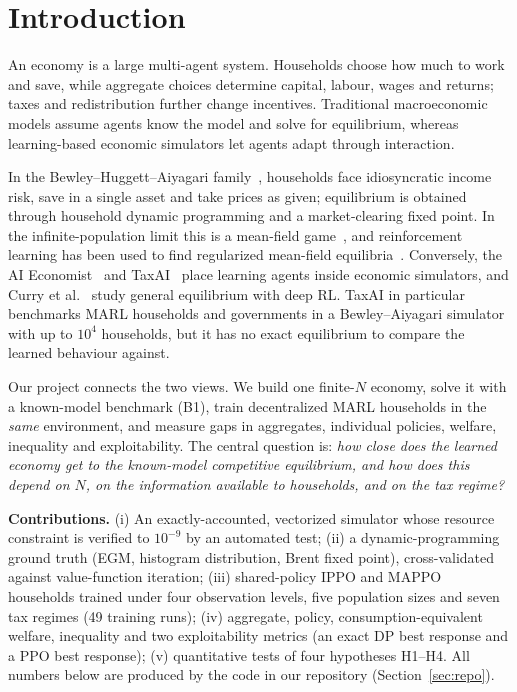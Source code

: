 \section{Introduction}
An economy is a large multi-agent system. Households choose how much to work and save, while aggregate choices
determine capital, labour, wages and returns; taxes and redistribution further change incentives. Traditional
macroeconomic models assume agents know the model and solve for equilibrium, whereas learning-based economic
simulators let agents adapt through interaction.

In the Bewley--Huggett--Aiyagari family~\cite{aiyagari,huggett}, households face idiosyncratic income risk, save in a
single asset and take prices as given; equilibrium is obtained through household dynamic programming and a
market-clearing fixed point. In the infinite-population limit this is a mean-field game~\cite{lasry,light}, and
reinforcement learning has been used to find regularized mean-field equilibria~\cite{xu}. Conversely, the AI
Economist~\cite{aiecon} and TaxAI~\cite{taxai} place learning agents inside economic simulators, and Curry et
al.~\cite{curry} study general equilibrium with deep RL. TaxAI in particular benchmarks MARL households and
governments in a Bewley--Aiyagari simulator with up to $10^4$ households, but it has no exact equilibrium to compare
the learned behaviour against.

Our project connects the two views. We build one finite-$N$ economy, solve it with a known-model benchmark (B1), train
decentralized MARL households in the \emph{same} environment, and measure gaps in aggregates, individual policies,
welfare, inequality and exploitability. The central question is:
\emph{how close does the learned economy get to the known-model competitive equilibrium, and how does this depend on
$N$, on the information available to households, and on the tax regime?}

\textbf{Contributions.} (i) An exactly-accounted, vectorized simulator whose resource constraint is verified to
$10^{-9}$ by an automated test; (ii) a dynamic-programming ground truth (EGM, histogram distribution, Brent fixed
point), cross-validated against value-function iteration; (iii) shared-policy IPPO and MAPPO households trained under
four observation levels, five population sizes and seven tax regimes (49 training runs); (iv) aggregate, policy,
consumption-equivalent welfare, inequality and two exploitability metrics (an exact DP best response and a PPO best
response); (v) quantitative tests of four hypotheses H1--H4. All numbers below are produced by the code in our
repository (Section~\ref{sec:repo}).
